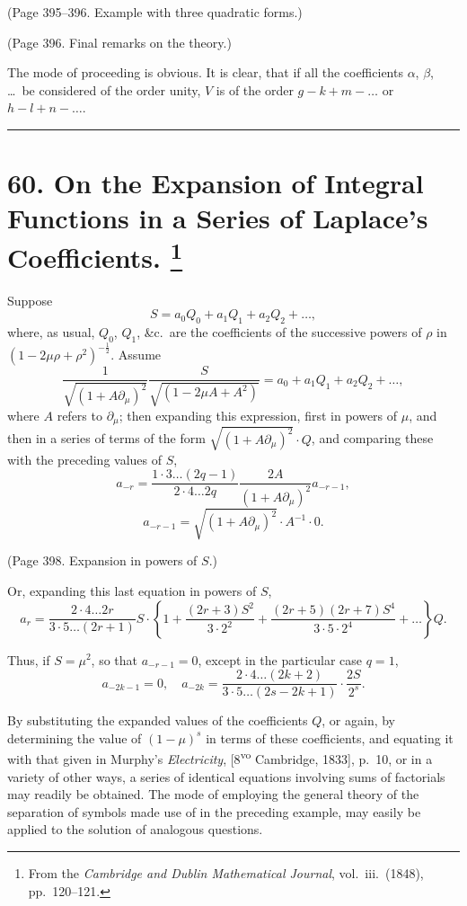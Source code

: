 \documentclass[11pt,a4paper]{article}
\theoremstyle{plain}
\theoremstyle{definition}
\begin{document}
(Page 395--396. Example with three quadratic forms.)

(Page 396. Final remarks on the theory.)

The mode of proceeding is obvious. It is clear, that if all the coefficients
$\alpha$, $\beta$, \ldots\ be considered of the order unity, $V$ is of the order
$g - k + m - \ldots$ or $h - l + n - \ldots$.

\bigskip
\hrule
\bigskip

\newpage
\section[On the Expansion of Integral Functions in a Series of Laplace's Coefficients]{%
60. On the Expansion of Integral Functions in a Series of Laplace's Coefficients.%
\footnote{From the \textit{Cambridge and Dublin Mathematical Journal}, vol.~iii.\ (1848), pp.~120--121.}}

Suppose
\[
S = a_0 Q_0 + a_1 Q_1 + a_2 Q_2 + \ldots, \tag{1}
\]
where, as usual, $Q_0$, $Q_1$, \&c.\ are the coefficients of the successive powers of $\rho$ in
$(1 - 2\mu\rho + \rho^2)^{-\frac{1}{2}}$. Assume
\[
\frac{1}{\sqrt{(1 + A\partial_\mu)^2}} \frac{S}{\sqrt{(1 - 2\mu A + A^2)}} = a_0 + a_1 Q_1 + a_2 Q_2 + \ldots, \tag{2}
\]
where $A$ refers to $\partial_\mu$; then expanding this expression, first in powers of $\mu$, and then
in a series of terms of the form $\sqrt{(1 + A\partial_\mu)^2} \cdot Q$, and comparing these with the preceding
values of $S$,
\[
a_{-r} = \frac{1 \cdot 3 \ldots (2q-1)}{2 \cdot 4 \ldots 2q} \frac{2A}{(1+A\partial_\mu)^2} a_{-r-1},
\]
\[
a_{-r-1} = \sqrt{(1 + A\partial_\mu)^2} \cdot A^{-1} \cdot 0. \tag{3}
\]

(Page 398. Expansion in powers of $S$.)

Or, expanding this last equation in powers of $S$,
\[
a_r = \frac{2 \cdot 4 \ldots 2r}{3 \cdot 5 \ldots (2r+1)} S \cdot \left\{
1 + \frac{(2r+3)S^2}{3 \cdot 2^2} + \frac{(2r+5)(2r+7)S^4}{3 \cdot 5 \cdot 2^4} + \ldots
\right\} Q.
\]

Thus, if $S = \mu^2$, so that $a_{-r-1} = 0$, except in the particular case $q = 1$,
\[
a_{-2k-1} = 0, \quad
a_{-2k} = \frac{2 \cdot 4 \ldots (2k+2)}{3 \cdot 5 \ldots (2s-2k+1)} \cdot \frac{2S}{2^s}.
\]

By substituting the expanded values of the coefficients $Q$, or again, by determining
the value of $(1-\mu)^s$ in terms of these coefficients, and equating it with that given in
Murphy's \textit{Electricity}, [8\textsuperscript{vo} Cambridge, 1833], p.~10, or in a variety of other ways,
a series of identical equations involving sums of factorials may readily be obtained.
The mode of employing the general theory of the separation of symbols made use of in
the preceding example, may easily be applied to the solution of analogous questions.
\end{document}
